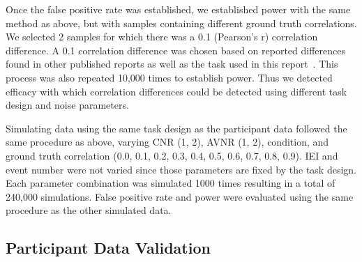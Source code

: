\documentclass[phd,appendix,figures]{uithesis}
\begin{document}
Once the false positive rate was established, we established power with the same method as above,
but with samples containing different ground truth correlations.
We selected 2 samples for which there was a 0.1 (Pearson's r) correlation difference.
A 0.1 correlation difference was chosen based on reported differences found in other published
reports as well as the task used in this report~\cite{Katsura2014,Lee2017,Turner2017,Lin2019,Huang2019}.
This process was also repeated 10,000 times to establish power.
Thus we detected efficacy with which correlation differences could be detected
using different task design and noise parameters.

Simulating data using the same task design as the participant data followed the same
procedure as above, varying CNR (1, 2), AVNR (1, 2), condition,
and ground truth correlation (0.0, 0.1, 0.2, 0.3, 0.4, 0.5, 0.6, 0.7, 0.8, 0.9).
IEI and event number were not varied since those parameters are fixed by the
task design.
Each parameter combination was simulated 1000 times resulting in a total of 240,000 simulations.
False positive rate and power were evaluated using the same procedure as the other simulated data.

\subsection*{Participant Data Validation}
\label{methods:task-switch}
\end{document}
